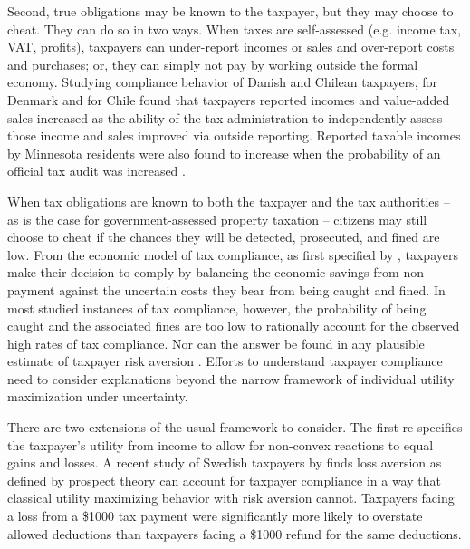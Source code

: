 \documentclass[12pt]{article}
\begin{document}
Second, true obligations may be known to the taxpayer, but they may
choose to cheat.  They can do so in two ways.  When taxes are
self-assessed (e.g. income tax, VAT, profits), taxpayers can
under-report incomes or sales and over-report costs and purchases; or,
they can simply not pay by working outside the formal economy.
Studying compliance behavior of Danish and Chilean taxpayers,
 for Denmark and  for Chile found
that taxpayers reported incomes and value-added sales increased as the
ability of the tax administration to independently assess those income
and sales improved via outside reporting.  Reported taxable incomes by
Minnesota residents were also found to increase when the probability
of an official tax audit was increased \cite{Blumenthal-01}.

When tax obligations are known to both the taxpayer and the tax
authorities -- as is the case for government-assessed property
taxation -- citizens may still choose to cheat if the chances they
will be detected, prosecuted, and fined are low.  From the economic
model of tax compliance, as first specified by
, taxpayers make their decision to comply
by balancing the economic savings from non-payment against the
uncertain costs they bear from being caught and fined.  In most
studied instances of tax compliance, however, the probability of being
caught and the associated fines are too low to rationally account for
the observed high rates of tax compliance.  Nor can the answer be
found in any plausible estimate of taxpayer risk aversion
\cite{Alm-92}. Efforts to understand taxpayer compliance need to
consider explanations beyond the narrow framework of individual
utility maximization under uncertainty.

There are two extensions of the usual framework to consider.  The
first re-specifies the taxpayer's utility from income to allow for
non-convex reactions to equal gains and losses.  A recent study of
Swedish taxpayers by  finds loss aversion as
defined by prospect theory can account for taxpayer compliance in a
way that classical utility maximizing behavior with risk aversion
cannot.  Taxpayers facing a loss from a \$1000 tax payment were
significantly more likely to overstate allowed deductions than
taxpayers facing a \$1000 refund for the same deductions.
\end{document}
